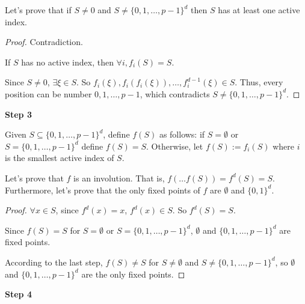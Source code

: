 Let's prove that if $S \neq 0$ and $S \neq \{0,1, \dots, p-1 \}^d$ then $S$ has at least one active index.

\begin{proof}
Contradiction.

If $S$ has no active index, then $\forall i, f_i(S) = S$.

Since $S \neq 0$, $\exists \xi \in S$. So $f_i(\xi), f_i(f_i(\xi)), \dots, f^{d-1}_i(\xi) \in S$. Thus, every position can be number $0, 1, \dots, p-1$, which contradicts $S \neq \{0, 1, \dots, p-1\}^d$.
\end{proof}

\textbf{Step 3}

Given $S \subseteq \{0,1, \dots, p-1\}^d$, define $f(S)$ as follows: if $S = \emptyset$ or $S = \{0,1, \dots, p-1\}^d$ define $f(S) = S$. Otherwise, let $f(S) := f_i(S)$ where $i$ is the smallest active index of $S$.

Let's prove that $f$ is an involution. That is, $f(\dots f(S)) = f^d(S) = S$. Furthermore, let's prove that the only fixed points of $f$ are $\emptyset$ and $\{0,1\}^d$.

\begin{proof}
$\forall x \in S$, since $f^d(x) = x$, $f^d(x) \in S$. So $f^d(S) = S$.

Since $f(S) = S$ for $S = \emptyset$ or $S = \{0,1, \dots, p-1\}^d$, $\emptyset$ and $\{0,1, \dots, p-1\}^d$ are fixed points.

According to the last step, $f(S) \neq S$ for $S \neq \emptyset$ and $S \neq \{0,1, \dots, p-1 \}^d$, so $\emptyset$ and $\{0,1, \dots, p-1\}^d$ are the only fixed points.
\end{proof}

\textbf{Step 4}


